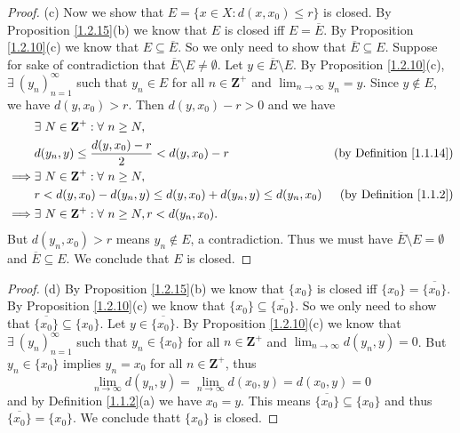 \begin{proof}{(c)}
    Now we show that \(E = \{x \in X : d(x, x_0) \leq r\}\) is closed.
    By Proposition \ref{1.2.15}(b) we know that \(E\) is closed iff \(E = \overline{E}\).
    By Proposition \ref{1.2.10}(c) we know that \(E \subseteq \overline{E}\).
    So we only need to show that \(\overline{E} \subseteq E\).
    Suppose for sake of contradiction that \(\overline{E} \setminus E \neq \emptyset\).
    Let \(y \in \overline{E} \setminus E\).
    By Proposition \ref{1.2.10}(c), \(\exists\ (y_n)_{n = 1}^\infty\) such that \(y_n \in E\) for all \(n \in \mathbf{Z}^+\) and \(\lim_{n \to \infty} y_n = y\).
    Since \(y \notin E\), we have \(d(y, x_0) > r\).
    Then \(d(y, x_0) - r > 0\) and we have
    \begin{align*}
                 & \exists\ N \in \mathbf{Z}^+ : \forall\ n \geq N,                                                            \\
                 & d(y_n, y) \leq \frac{d(y, x_0) - r}{2} < d(y, x_0) - r                & \text{(by Definition \ref{1.1.14})} \\
        \implies & \exists\ N \in \mathbf{Z}^+ : \forall\ n \geq N,                                                            \\
                 & r < d(y, x_0) - d(y_n, y) \leq d(y, x_0) + d(y_n, y) \leq d(y_n, x_0) & \text{(by Definition \ref{1.1.2})}  \\
        \implies & \exists\ N \in \mathbf{Z}^+ : \forall\ n \geq N, r < d(y_n, x_0).
    \end{align*}
    But \(d(y_n, x_0) > r\) means \(y_n \notin E\), a contradiction.
    Thus we must have \(\overline{E} \setminus E = \emptyset\) and \(\overline{E} \subseteq E\).
    We conclude that \(E\) is closed.
\end{proof}

\begin{proof}{(d)}
    By Proposition \ref{1.2.15}(b) we know that \(\{x_0\}\) is closed iff \(\{x_0\} = \overline{\{x_0\}}\).
    By Proposition \ref{1.2.10}(c) we know that \(\{x_0\} \subseteq \overline{\{x_0\}}\).
    So we only need to show that \(\overline{\{x_0\}} \subseteq \{x_0\}\).
    Let \(y \in \overline{\{x_0\}}\).
    By Proposition \ref{1.2.10}(c) we know that \(\exists\ (y_n)_{n = 1}^\infty\) such that \(y_n \in \{x_0\}\) for all \(n \in \mathbf{Z}^+\) and \(\lim_{n \to \infty} d(y_n, y) = 0\).
    But \(y_n \in \{x_0\}\) implies \(y_n = x_0\) for all \(n \in \mathbf{Z}^+\), thus
    \[
        \lim_{n \to \infty} d(y_n, y) = \lim_{n \to \infty} d(x_0, y) = d(x_0, y) = 0
    \]
    and by Definition \ref{1.1.2}(a) we have \(x_0 = y\).
    This means \(\overline{\{x_0\}} \subseteq \{x_0\}\) and thus \(\overline{\{x_0\}} = \{x_0\}\).
    We conclude thatt \(\{x_0\}\) is closed.
\end{proof}

